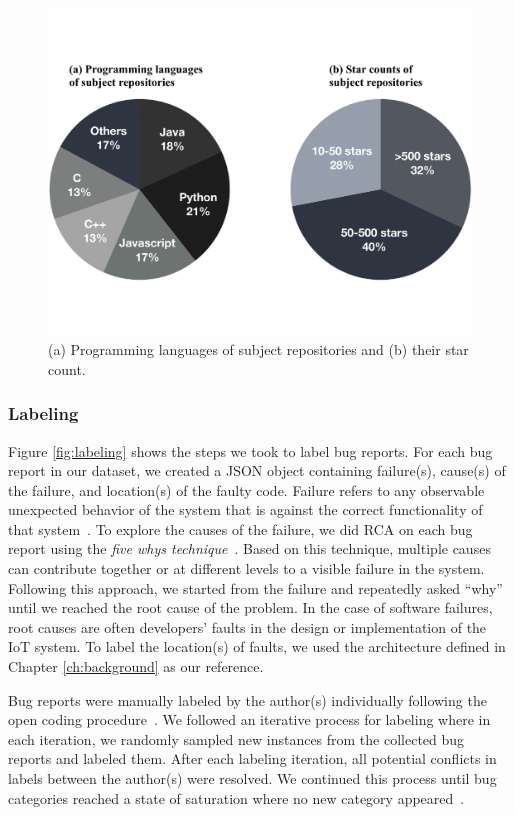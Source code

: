  \begin{figure}
  \centering
   \includegraphics[width=\linewidth]{imgs/repodemog}
  \caption{(a) Programming languages of subject repositories and (b) their star count.}
  \label{fig:repodemog}
\end{figure}


\subsubsection{Labeling} 
Figure \autoref{fig:labeling} shows the steps we took to label bug reports. For each bug report in our dataset, we created a JSON object containing failure(s), cause(s) of the failure, and location(s) of the faulty code. Failure refers to any observable unexpected behavior of the system that is against the correct functionality of that system~\cite{bugCharOpenSoftware,failureDefinition}. To explore the causes of the failure, we did RCA on each bug report using the \emph{five whys technique}~\cite{serrat2017five}. Based on this technique, multiple causes can contribute together or at different levels to a visible failure in the system. Following this approach, we started from the failure and repeatedly asked ``why'' until we reached the root cause of the problem. In the case of software failures, root causes are often developers' faults in the design or implementation of the IoT system. To label the location(s) of faults, we used the architecture defined in Chapter \ref{ch:background} as our reference. 

Bug reports were manually labeled by the author(s) individually following the open coding procedure~\cite{qualitativeStudySE}. We followed an iterative process for labeling where in each iteration, we randomly sampled new instances from the collected bug reports and labeled them. After each labeling iteration, all potential conflicts in labels between the author(s) were resolved. We continued this process until bug categories reached a state of saturation where no new category appeared~\cite{dataSaturationFusch}. 

